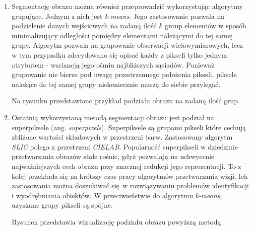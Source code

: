 {{{\begin{enumerate}
                \item Segmentację obrazu można również przeprowadzić wykorzystując algorytmy grupujące. Jednym z nich
                jest \textit{k-means}. Jego zastosowanie pozwala na podzielenie danych wejściowych na zadaną ilość $k$
                group elementów w sposób minimalizujący odległości pomiędzy elementami należącymi do tej samej
                grupy\cite{MacQueen1967SomeMF}. Algorytm pozwala na grupowanie obserwacji wielowymiarowych, lecz w tym
                przypadku zdecydowano się opisać każdy z pikseli tylko jednym atrybutem - wariancją jego ośmiu
                najbliższych sąsiadów. Ponieważ grupowanie nie bierze pod uwagę przestrzennego położenia pikseli,
                piksele należące do tej samej grupy niekoniecznie muszą do siebie przylegać.

                Na rysunku przedstawiono przykład podziału obrazu na zadaną ilość grup.

                \item Ostatnią wykorzystaną metodą segmentacji obrazu jest podział na superpiksele (ang.
                \textit{superpixels}). Superpiksele są grupami pikseli które cechują zbliżone wartości składowych w
                przestrzeni barw. Zastosowany algorytm \textit{SLIC} polega z przestrzeni
                \textit{CIELAB}\cite{Achanta2012SLICSC}. Popularność superpikseli w dziedzinie przetwarzania obrazów
                stale rośnie, gdyż pozwalają na uchwycenie najważniejszych cech obrazu przy znacznej redukcji jego
                reprezentacji. To z kolej przekłada się na krótszy czas pracy algorytmów przetwarzania wizji. Ich
                zastosowania można doszukiwać się w rozwiązywaniu problemów identyfikacji i wyodrębniania obiektów. W
                przeciwieństwie do algorytmu \textit{k-means}, uzyskane grupy pikseli są spójne.

                Rysunek przedstawia wizualizację podziału obrazu powyższą metodą.
            \end{enumerate}
        }
    }
}

